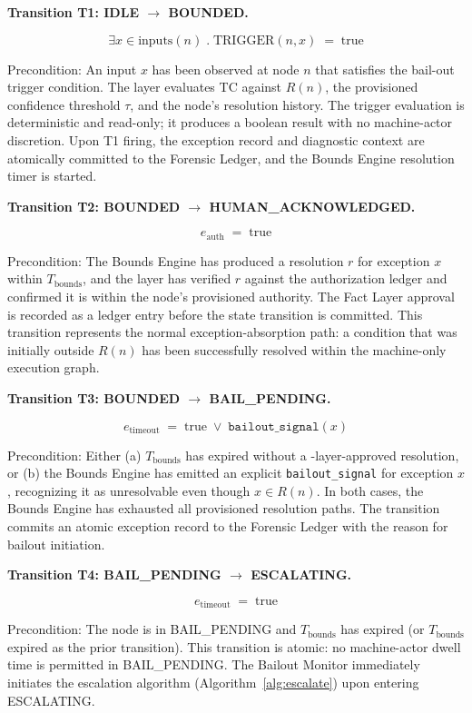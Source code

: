 \medskip
\noindent\textbf{Transition T1: IDLE $\rightarrow$ BOUNDED.}

\[
\exists x \in \text{inputs}(n) \;.\; \text{TRIGGER}(n, x) \;=\; \text{true}
\tag{T1}
\]

Precondition: An input $x$ has been observed at node $n$ that satisfies the bail-out trigger condition. The \bounds{} layer evaluates TC against $R(n)$, the provisioned confidence threshold $\tau$, and the node's resolution history. The trigger evaluation is deterministic and read-only; it produces a boolean result with no machine-actor discretion. Upon T1 firing, the exception record and diagnostic context are atomically committed to the Forensic Ledger, and the Bounds Engine resolution timer is started.

\medskip
\noindent\textbf{Transition T2: BOUNDED $\rightarrow$ HUMAN\_ACKNOWLEDGED.}

\[
e_{\text{auth}} \;=\; \text{true}
\tag{T2}
\]

Precondition: The Bounds Engine has produced a resolution $r$ for exception $x$ within $T_{\text{bounds}}$, and the \fact{} layer has verified $r$ against the authorization ledger and confirmed it is within the node's provisioned authority. The Fact Layer approval is recorded as a ledger entry before the state transition is committed. This transition represents the normal exception-absorption path: a condition that was initially outside $R(n)$ has been successfully resolved within the machine-only execution graph.

\medskip
\noindent\textbf{Transition T3: BOUNDED $\rightarrow$ BAIL\_PENDING.}

\[
e_{\text{timeout}} \;=\; \text{true} \;\lor\; \texttt{bailout\_signal}(x)
\tag{T3}
\]

Precondition: Either (a) $T_{\text{bounds}}$ has expired without a \fact-layer-approved resolution, or (b) the Bounds Engine has emitted an explicit \texttt{bailout\_signal} for exception $x$, recognizing it as unresolvable even though $x \in R(n)$. In both cases, the Bounds Engine has exhausted all provisioned resolution paths. The transition commits an atomic exception record to the Forensic Ledger with the reason for bailout initiation.

\medskip
\noindent\textbf{Transition T4: BAIL\_PENDING $\rightarrow$ ESCALATING.}

\[
e_{\text{timeout}} \;=\; \text{true}
\tag{T4}
\]

Precondition: The node is in BAIL\_PENDING and $T_{\text{bounds}}$ has expired (or $T_{\text{bounds}}$ expired as the prior transition). This transition is atomic: no machine-actor dwell time is permitted in BAIL\_PENDING. The Bailout Monitor immediately initiates the escalation algorithm (Algorithm~\ref{alg:escalate}) upon entering ESCALATING.

